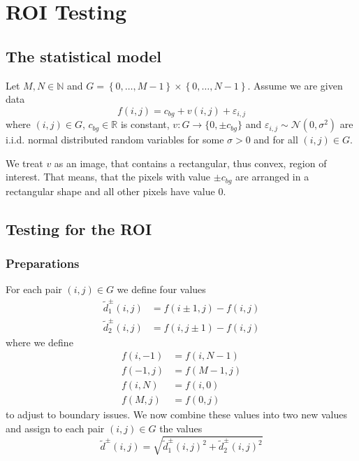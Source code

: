 \documentclass[a4paper,12pt]{article}
\theoremstyle{plain}
\theoremstyle{definition}
\theoremstyle{remark}
\begin{document}
	\tableofcontents
	
	\newpage
	
	\section{ROI Testing}
	
	\subsection{The statistical model}
	
	Let $M, N \in \mathbb{N}$ and $G = \left\{ 0, \dots, M-1 \right\} \times  \left\{ 0, \dots, N-1 \right\}$. Assume we are given data
	\begin{equation}\label{f}
		f(i, j) = c_{bg} + v(i, j) + \varepsilon_{i, j}
	\end{equation}
	where $(i, j) \in G$, $c_{bg} \in \mathbb{R}$ is constant, $v: G \to \{ 0, \pm c_{bg} \}$ and $\varepsilon_{i, j} \sim \mathcal{N}(0, \sigma^2)$ are i.i.d. normal distributed random variables for some $\sigma > 0$ and for all $(i, j) \in G$.
	
	We treat $v$ as an image, that contains a rectangular, thus convex, region of interest. That means, that the pixels with value $\pm c_{bg}$ are arranged in a rectangular shape and all other pixels have value $0$.
	
	\subsection{Testing for the ROI}
	
	\subsubsection{Preparations}
	
	For each pair $(i, j) \in G$ we define four values
	\begin{align}
		\tilde{d}^\pm_1(i, j) &= f(i \pm 1, j) - f(i, j) \label{d1} \\
		\tilde{d}^\pm_2(i, j) &= f(i, j \pm 1) - f(i, j) \label{d2}
	\end{align}
	where we define
	\begin{align*}
		f(i, -1) &= f(i, N-1) \\
		f(-1, j) &= f(M-1, j) \\
		f(i, N) &= f(i, 0) \\
		f(M, j) &= f(0, j)
	\end{align*}
	to adjust to boundary issues. We now combine these values into two new values and assign to each pair $(i, j) \in G$ the values
	\begin{equation}\label{d_tilde}
		\tilde{d}^\pm(i, j) = \sqrt{\tilde{d}_1^\pm(i, j)^2 + \tilde{d}_2^\pm(i, j)^2}
	\end{equation}
	
\end{document}
